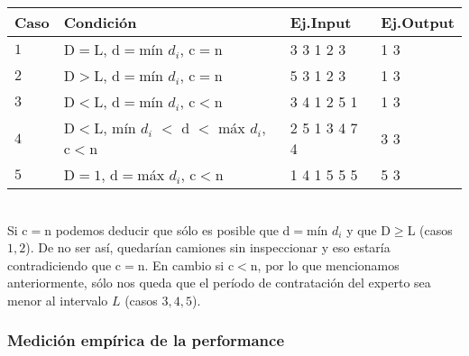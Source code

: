 \documentclass[11pt, a4paper, twoside]{article}
\begin{document}
\begin{tabular}{|l|l|l|l|}
	\hline
	Caso &  Condición  						              & Ej.Input      & Ej.Output \\
	\hline
	$1$  &  D$=$L, d$=$mín $d_i$, c$=$n    				  & 3 3 1 2 3     & 1 3 \\	
	$2$  &	D$>$L, d$=$mín $d_i$, c$=$n     		      & 5 3 1 2 3     & 1 3 \\
	\hline	
	$3$  &	D$<$L, d$=$mín $d_i$, c$<$n     			  & 3 4 1 2 5 1   & 1 3 \\
	$4$  &	D$<$L, mín $d_i$ $<$ d $<$ máx $d_i$, c$<$n   & 2 5 1 3 4 7 4 & 3 3 \\
	$5$  &	D$=1$, d$=$máx $d_i$, c$<$n     			  & 1 4 1 5 5 5   & 5 3 \\	
	\hline
\end{tabular} \\

Si c$=$n podemos deducir que sólo es posible que d$=$mín $d_i$ y que D$\ge$L (casos $1,2$). De no ser así, quedarían camiones sin inspeccionar y eso estaría contradiciendo que c$=$n. En cambio si c$<$n, por lo que mencionamos anteriormente, sólo nos queda que el período de contratación del experto sea menor al intervalo $L$ (casos $3,4,5$). 

\subsubsection{Medición empírica de la performance}

\end{document}

